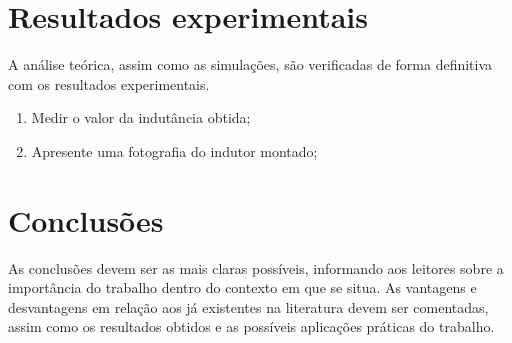 \section{Resultados experimentais}
A análise teórica, assim como as simulações, são verificadas de forma definitiva com os resultados experimentais.
\begin{enumerate}									
	\item  Medir o valor da indutância obtida;
	\item  Apresente uma fotografia do indutor montado;
\end{enumerate}

\section{Conclusões} 


As conclusões devem ser as mais claras possíveis, informando aos leitores sobre a importância do trabalho dentro do contexto em que se situa. As vantagens e desvantagens em relação aos já existentes na literatura devem ser comentadas, assim como os resultados obtidos e as possíveis aplicações práticas do trabalho.





\balance


